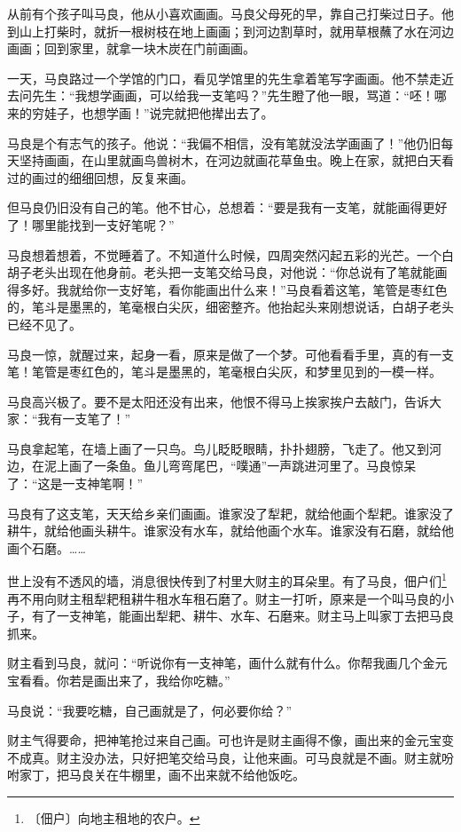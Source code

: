 \documentclass[12pt,UTF-8,openany]{ctexbook}
\begin{document}
\begin{large}
    
    从前有个孩子叫马良，他从小喜欢画画。马良父母死的早，靠自己打柴过日子。他到山上打柴时，就折一根树枝在地上画画；到河边割草时，就用草根蘸了水在河边画画；回到家里，就拿一块木炭在门前画画。
    
    一天，马良路过一个学馆的门口，看见学馆里的先生拿着笔写字画画。他不禁走近去问先生：“我想学画画，可以给我一支笔吗？”先生瞪了他一眼，骂道：“呸！哪来的穷娃子，也想学画！”说完就把他撵出去了。
    
    马良是个有志气的孩子。他说：“我偏不相信，没有笔就没法学画画了！”他仍旧每天坚持画画，在山里就画鸟兽树木，在河边就画花草鱼虫。晚上在家，就把白天看过的画过的细细回想，反复来画。
    
    但马良仍旧没有自己的笔。他不甘心，总想着：“要是我有一支笔，就能画得更好了！哪里能找到一支好笔呢？”
    
    马良想着想着，不觉睡着了。不知道什么时候，四周突然闪起五彩的光芒。一个白胡子老头出现在他身前。老头把一支笔交给马良，对他说：“你总说有了笔就能画得多好。我就给你一支好笔，看你能画出什么来！”马良看着这笔，笔管是枣红色的，笔斗是墨黑的，笔毫根白尖灰，细密整齐。他抬起头来刚想说话，白胡子老头已经不见了。
    
    马良一惊，就醒过来，起身一看，原来是做了一个梦。可他看看手里，真的有一支笔！笔管是枣红色的，笔斗是墨黑的，笔毫根白尖灰，和梦里见到的一模一样。
    
    马良高兴极了。要不是太阳还没有出来，他恨不得马上挨家挨户去敲门，告诉大家：“我有一支笔了！”
    
    马良拿起笔，在墙上画了一只鸟。鸟儿眨眨眼睛，扑扑翅膀，飞走了。他又到河边，在泥上画了一条鱼。鱼儿弯弯尾巴，“噗通”一声跳进河里了。马良惊呆了：“这是一支神笔啊！”
    
    马良有了这支笔，天天给乡亲们画画。谁家没了犁耙，就给他画个犁耙。谁家没了耕牛，就给他画头耕牛。谁家没有水车，就给他画个水车。谁家没有石磨，就给他画个石磨。……
    
    世上没有不透风的墙，消息很快传到了村里大财主的耳朵里。有了马良，佃户们\footnote{〔佃户〕向地主租地的农户。}再不用向财主租犁耙租耕牛租水车租石磨了。财主一打听，原来是一个叫马良的小子，有了一支神笔，能画出犁耙、耕牛、水车、石磨来。财主马上叫家丁去把马良抓来。
    
    财主看到马良，就问：“听说你有一支神笔，画什么就有什么。你帮我画几个金元宝看看。你若是画出来了，我给你吃糖。”
    
    马良说：“我要吃糖，自己画就是了，何必要你给？”
    
    财主气得要命，把神笔抢过来自己画。可也许是财主画得不像，画出来的金元宝变不成真。财主没办法，只好把笔交给马良，让他来画。可马良就是不画。财主就吩咐家丁，把马良关在牛棚里，画不出来就不给他饭吃。
    

\end{large}
\end{document}
